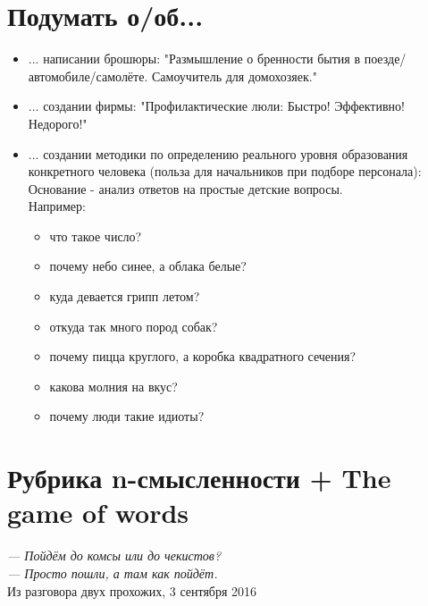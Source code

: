 \documentclass[12pt,a4paper]{article}
\begin{document}
\section*{Подумать о/об...}
\begin{itemize}
\item ... написании брошюры: "Размышление о бренности бытия в поезде/автомобиле/самолёте. Самоучитель для домохозяек."
\item ... создании фирмы: "Профилактические люли: Быстро! Эффективно! Недорого!"
\item ...  создании методики по определению реального уровня образования конкретного человека (польза для начальников при подборе персонала):\\

Основание - анализ ответов на простые детские вопросы.\\
Например:\\
    \begin{itemize}
        \item что такое число?\\
        \item почему небо синее, а облака белые?\\
        \item куда девается грипп летом?\\
        \item откуда так много пород собак?\\
        \item почему пицца круглого, а коробка квадратного сечения?\\
        \item какова молния на вкус?\\
        \item почему люди такие идиоты?
    \end{itemize}
\end{itemize}
\newpage
\section*{Рубрика n-смысленности + The game of words}

\begin{displayquote}
\begin{flushright}
    \textit{--- Пойдём до комсы или до чекистов?\\
    --- Просто пошли, а там как пойдёт.}\\
    Из разговора двух прохожих, 3 сентября 2016
\end{flushright}
\end{displayquote}
\end{document}
